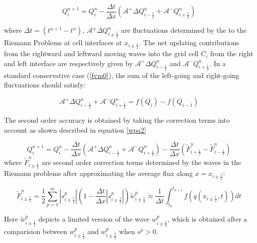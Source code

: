 \documentclass[12pt,a4paper]{article}
\begin{document}
	\begin{equation}
		Q_{i}^{n+1} =  Q_{i}^{n} - \frac{\Delta t}{\Delta x}(\mathcal{A^{+}}\Delta 	Q_{i-\frac{1}{2}}^{n} + \mathcal{A^{-}}Q_{i+\frac{1}{2}}^{n})
		\label{wpa1}
	\end{equation}
	
	\noindent where $\Delta t = (t^{n+1} - t^{n})$, $\mathcal{A^{\pm}}\Delta 	Q_{i\pm\frac{1}{2}}^{n} $ are fluctuations determined by the to the Riemann Problems at cell interfaces at $x_{i\pm\frac{1}{2}}$. The net updating contributions from the rightward and leftward moving waves into the grid cell $C_{i}$  from the right and left interface are respectively given by $\mathcal{A^{+}}\Delta 	Q_{i-\frac{1}{2}}^{n}$ and  $\mathcal{A^{-}}Q_{i+\frac{1}{2}}^{n}$\cite{ge:2008}. In a standard  conservative case (\eqref{fvm0}), the sum of the left-going and right-going fluctuations should satisfy:
	
	\begin{equation}
		\mathcal{A^{+}}\Delta 	Q_{i-\frac{1}{2}}^{n} + \mathcal{A^{-}}Q_{i+\frac{1}{2}}^{n} = f(Q_{i}) - f(Q_{i-1})
	\end{equation}
	
	\noindent The second order accuracy is obtained by taking the correction terms into account as shown described in equation \eqref{wpa2}
	
	\begin{equation}
		Q_{i}^{n+1} =  Q_{i}^{n} - \frac{\Delta t}{\Delta x}(\mathcal{A^{+}}\Delta 	Q_{i-\frac{1}{2}}^{n} + \mathcal{A^{-}}Q_{i+\frac{1}{2}}^{n}) -  \frac{\Delta t}{\Delta x} (\tilde{F}_{i+\frac{1}{2}}^{n} - \tilde{F}_{i-\frac{1}{2}}^{n} )
		\label{wpa2}
	\end{equation}
	\noindent where $\tilde{F}_{i\pm\frac{1}{2}}^{n} $ are second order correction terms determined by the waves in the Riemann problems after approximating the average flux along  $x = x_{i\pm \frac{1}{2}}$:
	
	\begin{equation}
			\tilde{F}_{i\pm\frac{1}{2}}^{n} = \frac{1}{2} \sum_{p=1}^{m}  |s_{i\pm \frac{1}{2}}^{p}| \left( 1 - \frac{\Delta t}{\Delta x} |s_{i\pm \frac{1}{2}}^{p}|\right) \tilde{w}_{i\pm\frac{1}{2}}^{p} \approx \frac{1}{\Delta t} \int_{t_{n}}^{t_{n+1}} f(q(x_{i\pm\frac{1}{2}},t))dt
		\label{wpa13}
	\end{equation}

	\noindent Here $\tilde{w}_{i\pm\frac{1}{2}}^{p} $ depicts a limited version of the wave $w_{i\pm\frac{1}{2}}^{p} $, which is obtained after a comparision between $w_{i\pm\frac{1}{2}}^{p} $ and $w_{i\pm\frac{3}{2}}^{p} $ when $s^{p} >0$. 
\end{document}
